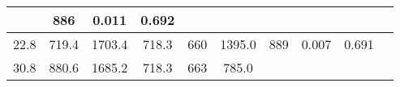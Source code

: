 \documentclass[a4paper,10pt]{article}
\begin{document}
\begin{longtable}{
     |
%    
    c|
%    
    c|
%    
    c|
%    
    c|
%    
    c|
%    
    c|
%    
    c|
%    
    c|
%    
    c|
%    
    c|
%    
    }
%        
        & 886
%        

%        

%        
        & 0.011
%        

%        

%        
        & 0.692
%        

%        
        \\
        \hline

        

%        

%        
        22.8
%        

%        

%        
        & 719.4
%        

%        

%        
        & 1703.4
%        

%        

%        
        & 718.3
%        

%        

%        
        & 660
%        

%        

%        
        & 1395.0
%        

%        

%        
        & 889
%        

%        

%        
        & 0.007
%        

%        

%        
        & 0.691
%        

%        
        \\
        \hline

        

%        

%        
        30.8
%        

%        

%        
        & 880.6
%        

%        

%        
        & 1685.2
%        

%        

%        
        & 718.3
%        

%        

%        
        & 663
%        

%        

%        
        & 785.0
%        

%        


\end{longtable}
\end{document}
